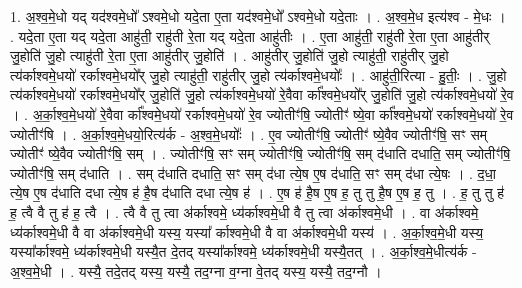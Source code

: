 \documentclass[17pt]{extarticle}
\begin{document}
1. अ॒श्व॒मे॒धो यद् यद॑श्वमे॒धो᳚ ऽश्वमे॒धो यदे॒ता ए॒ता यद॑श्वमे॒धो᳚ ऽश्वमे॒धो यदे॒ताः । . अ॒श्व॒मे॒ध इत्य॑श्व - मे॒धः । . यदे॒ता ए॒ता यद् यदे॒ता आहु॑ती॒ राहु॑ती रे॒ता यद् यदे॒ता आहु॑तीः । . ए॒ता आहु॑ती॒ राहु॑ती रे॒ता ए॒ता आहु॑तीर् जु॒होति॑ जु॒हो त्याहु॑ती रे॒ता ए॒ता आहु॑तीर् जु॒होति॑ । . आहु॑तीर् जु॒होति॑ जु॒हो त्याहु॑ती॒ राहु॑तीर् जु॒हो त्य॑र्काश्वमे॒धयो॑ रर्काश्वमे॒धयो᳚र् जु॒हो त्याहु॑ती॒ राहु॑तीर् जु॒हो
त्य॑र्काश्वमे॒धयोः᳚ । . आहु॑ती॒रित्या - हु॒तीः॒ । . जु॒हो त्य॑र्काश्वमे॒धयो॑ रर्काश्वमे॒धयो᳚र् जु॒होति॑ जु॒हो त्य॑र्काश्वमे॒धयो॑ रे॒वैवा र्का᳚श्वमे॒धयो᳚र् जु॒होति॑ जु॒हो त्य॑र्काश्वमे॒धयो॑ रे॒व । . अ॒र्का॒श्व॒मे॒धयो॑ रे॒वैवा र्का᳚श्वमे॒धयो॑ रर्काश्वमे॒धयो॑ रे॒व ज्योतीꣳ॑षि॒ ज्योतीꣳ॑ ष्ये॒वा र्का᳚श्वमे॒धयो॑ रर्काश्वमे॒धयो॑ रे॒व ज्योतीꣳ॑षि । . अ॒र्का॒श्व॒मे॒धयो॒रित्य॑र्क - अ॒श्व॒मे॒धयोः᳚ । . ए॒व ज्योतीꣳ॑षि॒ ज्योतीꣳ॑ ष्ये॒वैव ज्योतीꣳ॑षि॒ सꣳ सम् ज्योतीꣳ॑ ष्ये॒वैव ज्योतीꣳ॑षि॒ सम् । . ज्योतीꣳ॑षि॒ सꣳ सम् ज्योतीꣳ॑षि॒ ज्योतीꣳ॑षि॒ सम् द॑धाति दधाति॒ सम् ज्योतीꣳ॑षि॒ ज्योतीꣳ॑षि॒ सम् द॑धाति । . सम् द॑धाति दधाति॒ सꣳ सम् द॑धा त्ये॒ष ए॒ष द॑धाति॒ सꣳ सम् द॑धा त्ये॒षः । . द॒धा॒ त्ये॒ष ए॒ष द॑धाति दधा त्ये॒ष ह॑ है॒ष द॑धाति दधा त्ये॒ष ह॑ । . ए॒ष ह॑ है॒ष ए॒ष ह॒ तु तु है॒ष ए॒ष ह॒ तु । . ह॒ तु तु ह॑ ह॒ त्वै वै तु ह॑ ह॒ त्वै । . त्वै वै तु त्वा अ॑र्काश्वमे॒ ध्य॑र्काश्वमे॒धी वै तु त्वा अ॑र्काश्वमे॒धी । . वा अ॑र्काश्वमे॒ ध्य॑र्काश्वमे॒धी वै वा अ॑र्काश्वमे॒धी यस्य॒ यस्या᳚ र्काश्वमे॒धी वै वा अ॑र्काश्वमे॒धी यस्य॑ । . अ॒र्का॒श्व॒मे॒धी यस्य॒ यस्या᳚र्काश्वमे॒ ध्य॑र्काश्वमे॒धी यस्यै॒त दे॒तद् यस्या᳚र्काश्वमे॒ 
ध्य॑र्काश्वमे॒धी यस्यै॒तत् । . अ॒र्का॒श्व॒मे॒धीत्य॑र्क - अ॒श्व॒मे॒धी । . यस्यै॒ तदे॒तद् यस्य॒ यस्यै॒ तद॒ग्ना व॒ग्ना वे॒तद् यस्य॒ यस्यै॒ तद॒ग्नौ । \newline
\end{document}
